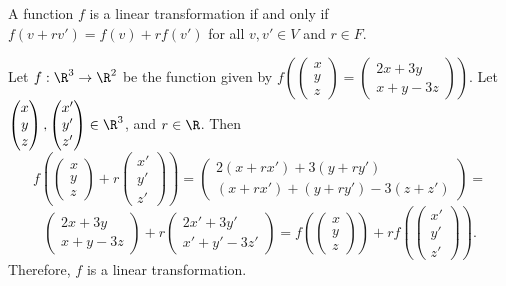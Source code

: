 \documentclass[12pt]{article}
\begin{document}
\begin{rmk}
    A function $f$ is a linear transformation if and only if $f(v + rv') = f(v) + rf(v')$ for all $v, v' \in V$ and $r \in F$.
\end{rmk}

\begin{exmp}
    Let $f: \R^3 \to \R^2$ be the function given by $f\left(
    \begin{pmatrix}
        x \\ y \\ z
    \end{pmatrix} =
    \begin{pmatrix}
        2x + 3y \\ x + y - 3z
    \end{pmatrix}\right)$. Let $\begin{pmatrix}
        x \\ y \\ z
    \end{pmatrix}, \begin{pmatrix}
        x' \\ y' \\ z'
    \end{pmatrix} \in \R^3$, and $r \in \R$. Then \[f\left(\begin{pmatrix}
        x \\ y \\ z
    \end{pmatrix} + r\begin{pmatrix}
        x'\\ y' \\ z'
    \end{pmatrix}\right) = \begin{pmatrix}
        2(x + rx') + 3(y + ry') \\
        (x + rx') + (y + ry') - 3(z + z')
    \end{pmatrix} = \]
    \[\begin{pmatrix}
        2x + 3y \\
        x + y - 3z
    \end{pmatrix} + r\begin{pmatrix}
        2x' + 3y' \\
        x' + y' - 3z'
    \end{pmatrix} = f\left(\begin{pmatrix}
        x \\ y \\ z
    \end{pmatrix}\right) + rf\left(\begin{pmatrix}
        x'\\ y' \\ z'
    \end{pmatrix}\right).\]
    Therefore, $f$ is a linear transformation.
\end{exmp}
\end{document}
